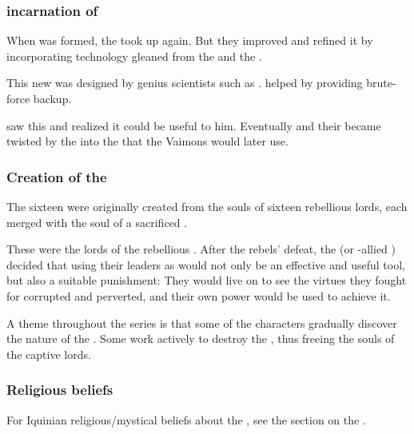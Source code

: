 \subsubsection{\Kezeradi{} incarnation of \iquin}
When \Kezerad{} was formed, the \Kezeradi{} took up \iquin{} again. 
But they improved and refined it by incorporating technology gleaned from the \ophidians{} and the . 

This new \iquin{} was designed by genius scientists such as . 
 helped by providing brute-force backup.  

 saw this \dweomer{} and realized it could be useful to him. 
Eventually  and their \iquin{} became twisted by the \sephiroth{} into the \iquin{} that the Vaimons would later use. 





\subsubsection{Creation of the \sephiroth}
The sixteen \Sephiroth{} were originally created from the souls of sixteen rebellious \resphan{} lords, each merged with the soul of a sacrificed \banelord. 

These \resphain{} were the lords of the rebellious \Kezeradi. After the rebels' defeat, the \banes{} (or \bane-allied \resphain) decided that using their leaders as \Sephiroth{} would not only be an effective and useful tool, but also a suitable punishment: They would live on to see the virtues they fought for corrupted and perverted, and their own power would be used to achieve it. 

A theme throughout the series is that some of the characters gradually discover the nature of the \sephiroth. 
Some work actively to destroy the \sephiroth, thus freeing the souls of the captive \Kezeradi{} lords. 





\subsubsection{Religious beliefs}
For Iquinian religious/mystical beliefs about the \sephiroth, see the section on the . 









